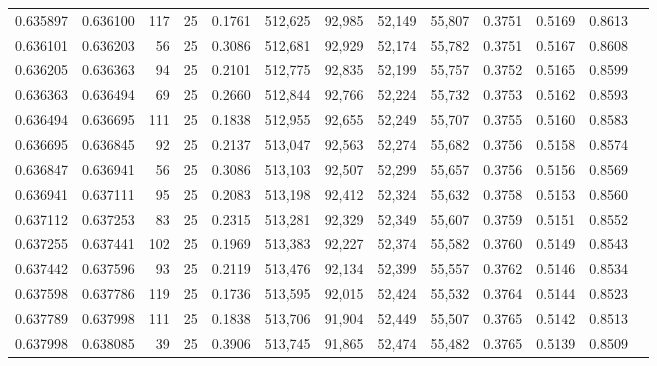 \begin{tabular}{rrrrrrrrrrrrr}
0.635897 & 0.636100 &   117 &  25 &                                     0.1761 & 512,625 &  92,985 &  52,149 &  55,807 & 0.3751 & 0.5169 & 0.8613 \\
0.636101 & 0.636203 &    56 &  25 &                                     0.3086 & 512,681 &  92,929 &  52,174 &  55,782 & 0.3751 & 0.5167 & 0.8608 \\
0.636205 & 0.636363 &    94 &  25 &                                     0.2101 & 512,775 &  92,835 &  52,199 &  55,757 & 0.3752 & 0.5165 & 0.8599 \\
0.636363 & 0.636494 &    69 &  25 &                                     0.2660 & 512,844 &  92,766 &  52,224 &  55,732 & 0.3753 & 0.5162 & 0.8593 \\
0.636494 & 0.636695 &   111 &  25 &                                     0.1838 & 512,955 &  92,655 &  52,249 &  55,707 & 0.3755 & 0.5160 & 0.8583 \\
0.636695 & 0.636845 &    92 &  25 &                                     0.2137 & 513,047 &  92,563 &  52,274 &  55,682 & 0.3756 & 0.5158 & 0.8574 \\
0.636847 & 0.636941 &    56 &  25 &                                     0.3086 & 513,103 &  92,507 &  52,299 &  55,657 & 0.3756 & 0.5156 & 0.8569 \\
0.636941 & 0.637111 &    95 &  25 &                                     0.2083 & 513,198 &  92,412 &  52,324 &  55,632 & 0.3758 & 0.5153 & 0.8560 \\
0.637112 & 0.637253 &    83 &  25 &                                     0.2315 & 513,281 &  92,329 &  52,349 &  55,607 & 0.3759 & 0.5151 & 0.8552 \\
0.637255 & 0.637441 &   102 &  25 &                                     0.1969 & 513,383 &  92,227 &  52,374 &  55,582 & 0.3760 & 0.5149 & 0.8543 \\
0.637442 & 0.637596 &    93 &  25 &                                     0.2119 & 513,476 &  92,134 &  52,399 &  55,557 & 0.3762 & 0.5146 & 0.8534 \\
0.637598 & 0.637786 &   119 &  25 &                                     0.1736 & 513,595 &  92,015 &  52,424 &  55,532 & 0.3764 & 0.5144 & 0.8523 \\
0.637789 & 0.637998 &   111 &  25 &                                     0.1838 & 513,706 &  91,904 &  52,449 &  55,507 & 0.3765 & 0.5142 & 0.8513 \\
0.637998 & 0.638085 &    39 &  25 &                                     0.3906 & 513,745 &  91,865 &  52,474 &  55,482 & 0.3765 & 0.5139 & 0.8509 \\

\end{tabular}
